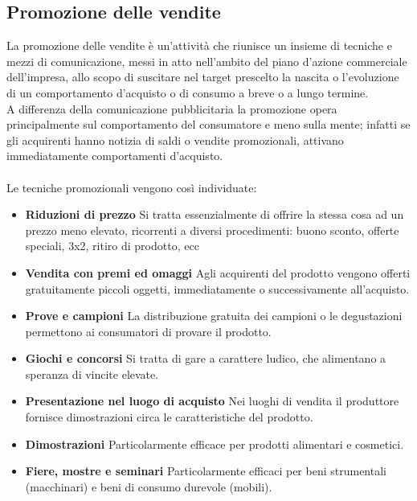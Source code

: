 \subsection{Promozione delle vendite}
La promozione delle vendite è un’attività che riunisce un insieme di tecniche e mezzi di comunicazione, messi in atto nell'ambito del piano d’azione commerciale dell'impresa, allo scopo di suscitare nel target prescelto la nascita o l’evoluzione di un comportamento d’acquisto o di consumo a breve o a lungo termine.
\\
A differenza della comunicazione pubblicitaria la promozione opera principalmente sul comportamento del consumatore e meno sulla mente; infatti se gli acquirenti hanno notizia di saldi o vendite promozionali, attivano immediatamente comportamenti d’acquisto.
\\
\\
Le tecniche promozionali vengono così individuate:
\begin{itemize}
	\item \textbf{Riduzioni di prezzo} Si tratta essenzialmente di offrire la stessa cosa ad un prezzo meno elevato, ricorrenti a diversi procedimenti: buono sconto, offerte speciali, 3x2, ritiro di prodotto, ecc
	\item \textbf{Vendita con premi ed omaggi} Agli acquirenti del prodotto vengono offerti gratuitamente piccoli oggetti, immediatamente o successivamente all'acquisto.
	\item \textbf{Prove e campioni} La distribuzione gratuita dei campioni o le degustazioni permettono ai consumatori di provare il prodotto.
	\item \textbf{Giochi e concorsi} Si tratta di gare a carattere ludico, che alimentano a speranza di vincite elevate.
	\item \textbf{Presentazione nel luogo di acquisto} Nei luoghi di vendita il produttore fornisce dimostrazioni circa le caratteristiche del prodotto.
	\item \textbf{Dimostrazioni} Particolarmente efficace per prodotti alimentari e cosmetici.
	\item \textbf{Fiere, mostre e seminari} Particolarmente efficaci per beni strumentali (macchinari) e beni di consumo durevole (mobili).
\end{itemize}

